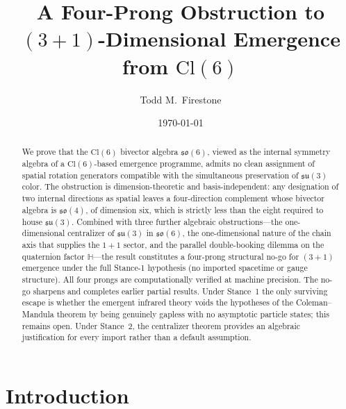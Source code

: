 \documentclass[aip,jmp,amsmath,amssymb,reprint,author-year]{revtex4-2}
\begin{document}
\title{A Four-Prong Obstruction to $(3{+}1)$-Dimensional Emergence
       from $\mathrm{Cl}(6)$}

\author{Todd M.~Firestone}

\date{\today}

\begin{abstract}
We prove that the $\mathrm{Cl}(6)$ bivector algebra $\mathfrak{so}(6)$,
viewed as the internal symmetry algebra of a $\mathrm{Cl}(6)$-based
emergence programme, admits no clean assignment of spatial rotation
generators compatible with the simultaneous preservation of
$\mathfrak{su}(3)$ color.  The obstruction is dimension-theoretic and
basis-independent: any designation of two internal directions as spatial
leaves a four-direction complement whose bivector algebra is
$\mathfrak{so}(4)$, of dimension six, which is strictly less than the
eight required to house $\mathfrak{su}(3)$.  Combined with three further
algebraic obstructions---the one-dimensional centralizer of
$\mathfrak{su}(3)$ in $\mathfrak{so}(6)$, the one-dimensional nature of
the chain axis that supplies the $1{+}1$ sector, and the parallel
double-booking dilemma on the quaternion factor
$\mathbb{H}$---the result constitutes a four-prong structural no-go for
$(3{+}1)$ emergence under the full Stance-1 hypothesis (no imported
spacetime or gauge structure).  All four prongs are computationally
verified at machine precision.  The no-go sharpens and completes earlier
partial results.  Under Stance~1 the only surviving escape is whether the
emergent infrared theory voids the hypotheses of the Coleman--Mandula
theorem by being genuinely gapless with no asymptotic particle states;
this remains open.  Under Stance~2, the centralizer theorem provides an
algebraic justification for every import rather than a default assumption.
\end{abstract}

\maketitle

\section{Introduction}
\end{document}
